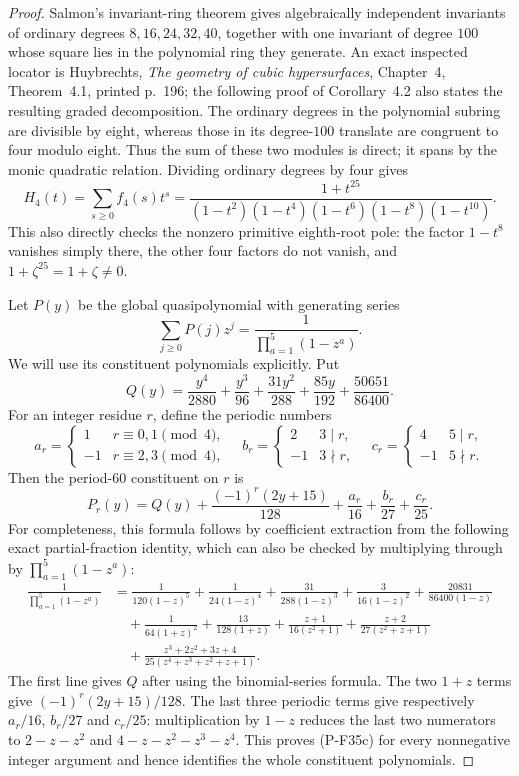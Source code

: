 \begin{proof}
Salmon's invariant-ring theorem gives algebraically independent
invariants of ordinary degrees $8,16,24,32,40$, together with
one invariant of degree $100$ whose square lies in the polynomial
ring they generate. An exact inspected locator is Huybrechts,
\emph{The geometry of cubic hypersurfaces}, Chapter~4,
Theorem~4.1, printed p.~196; the following proof of Corollary~4.2
also states the resulting graded decomposition. The ordinary
degrees in the polynomial subring are divisible by eight, whereas
those in its degree-$100$ translate are congruent to four modulo
eight. Thus the sum of these two modules is direct; it spans
by the monic quadratic relation. Dividing ordinary degrees by
four gives
\[
 H_4(t)=\sum_{s\ge0}f_4(s)t^s
       =\frac{1+t^{25}}{(1-t^2)(1-t^4)(1-t^6)(1-t^8)(1-t^{10})}.
 \tag{P-F35b}
\]
This also directly checks the nonzero primitive eighth-root
pole: the factor $1-t^8$ vanishes simply there, the other four
factors do not vanish, and $1+\zeta^{25}=1+\zeta\ne0$.

Let $P(y)$ be the global quasipolynomial with generating series
\[
                  \sum_{j\ge0}P(j)z^j
                       =\frac1{\prod_{a=1}^5(1-z^a)}.
\]
We will use its constituent polynomials explicitly. Put
\[
 Q(y)=\frac{y^4}{2880}+\frac{y^3}{96}
            +\frac{31y^2}{288}+\frac{85y}{192}
            +\frac{50651}{86400}.
\]
For an integer residue $r$, define the periodic numbers
\[
 a_r=\begin{cases}1&r\equiv0,1\pmod4,\\-1&r\equiv2,3\pmod4,\end{cases}
 \quad
 b_r=\begin{cases}2&3\mid r,\\-1&3\nmid r,\end{cases}
 \quad
 c_r=\begin{cases}4&5\mid r,\\-1&5\nmid r.\end{cases}
\]
Then the period-$60$ constituent on $r$ is
\[
 P_r(y)=Q(y)+\frac{(-1)^r(2y+15)}{128}
                   +\frac{a_r}{16}+\frac{b_r}{27}+\frac{c_r}{25}.
 \tag{P-F35c}
\]
For completeness, this formula follows by coefficient extraction
from the following exact partial-fraction identity, which can also
be checked by multiplying through by $\prod_{a=1}^5(1-z^a)$:
\begin{align*}
 \frac1{\prod_{a=1}^5(1-z^a)}
 &=\frac1{120(1-z)^5}+\frac1{24(1-z)^4}
   +\frac{31}{288(1-z)^3}+\frac3{16(1-z)^2}
   +\frac{20831}{86400(1-z)}\\
 &\quad+\frac1{64(1+z)^2}+\frac{13}{128(1+z)}
   +\frac{z+1}{16(z^2+1)}
   +\frac{z+2}{27(z^2+z+1)}\\
 &\quad+\frac{z^3+2z^2+3z+4}
                  {25(z^4+z^3+z^2+z+1)}.
 \tag{P-F35d}
\end{align*}
The first line gives $Q$ after using the binomial-series formula.
The two $1+z$ terms give $(-1)^r(2y+15)/128$.
The last three periodic terms give respectively $a_r/16$,
$b_r/27$ and $c_r/25$: multiplication by $1-z$ reduces
the last two numerators to $2-z-z^2$ and
$4-z-z^2-z^3-z^4$. This proves (P-F35c) for every
nonnegative integer argument and hence identifies the whole
constituent polynomials.


\end{proof}
